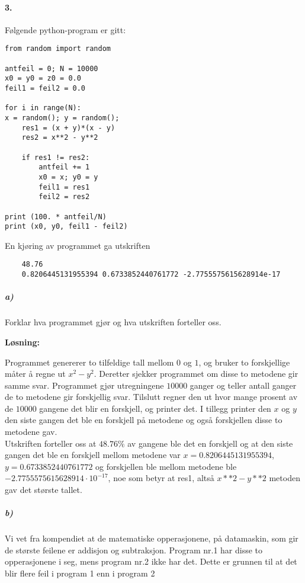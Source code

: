 \documentclass[11pt,norsk]{article}
\begin{document}
		\paragraph{3.}
			\begin{flushleft}
Følgende python-program er gitt:
			\end{flushleft}
			\begin{verbatim}
from random import random

antfeil = 0; N = 10000
x0 = y0 = z0 = 0.0
feil1 = feil2 = 0.0

for i in range(N):
x = random(); y = random();
    res1 = (x + y)*(x - y)
    res2 = x**2 - y**2
    
    if res1 != res2:
        antfeil += 1
        x0 = x; y0 = y
        feil1 = res1
        feil2 = res2

print (100. * antfeil/N)
print (x0, y0, feil1 - feil2)
			\end{verbatim}

En kjøring av programmet ga utskriften

			{\small\begin{verbatim}
	48.76
	0.8206445131955394 0.6733852440761772 -2.7755575615628914e-17
			\end{verbatim}}
			\subparagraph{a)}
				\begin{flushleft}
Forklar hva programmet gjør og hva utskriften forteller oss.
				\end{flushleft}
				\begin{flushleft}
\textbf{Løsning:}
				\end{flushleft}
				\begin{flushleft}
Programmet genererer to tilfeldige tall mellom $0$ og $1$, og bruker to forskjellige måter å regne ut $x^2 - y^2$. Deretter sjekker programmet om disse to metodene gir samme svar. Programmet gjør utregningene $10000$ ganger og teller antall ganger de to metodene gir forskjellig svar. Tilslutt regner den ut hvor mange prosent av de $10000$ gangene det blir en forskjell, og printer det. I tillegg printer den $x$ og $y$ den siste gangen det ble en forskjell på metodene og også forskjellen disse to metodene gav. \\
Utskriften forteller oss at $48.76\%$ av gangene ble det en forskjell og at den siste gangen det ble en forskjell mellom metodene var $x = 0.8206445131955394$, $y = 0.6733852440761772$ og forskjellen ble mellom metodene ble $-2.7755575615628914 \cdot 10^{-17}$, noe som betyr at res1, altså $x**2 - y**2$ metoden gav det største tallet.
				\end{flushleft}
			\subparagraph{b)}
				\begin{flushleft}
Vi vet fra kompendiet at de matematiske opperasjonene, på datamaskin, som gir de største feilene er addisjon og subtraksjon. Program nr.1 har disse to opperasjonene i seg, mens program nr.2 ikke har det. Dette er grunnen til at det blir flere feil i program 1 enn i program 2
				\end{flushleft}
\end{document}
